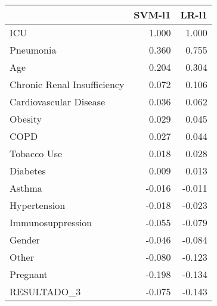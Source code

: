 \begin{tabular}{lrr}
\toprule
{} &  SVM-l1 &  LR-l1 \\
\midrule
ICU                         &   1.000 &  1.000 \\
Pneumonia                   &   0.360 &  0.755 \\
Age                         &   0.204 &  0.304 \\
Chronic Renal Insufficiency &   0.072 &  0.106 \\
Cardiovascular Disease      &   0.036 &  0.062 \\
Obesity                     &   0.029 &  0.045 \\
COPD                        &   0.027 &  0.044 \\
Tobacco Use                 &   0.018 &  0.028 \\
Diabetes                    &   0.009 &  0.013 \\
Asthma                      &  -0.016 & -0.011 \\
Hypertension                &  -0.018 & -0.023 \\
Immunosuppression           &  -0.055 & -0.079 \\
Gender                      &  -0.046 & -0.084 \\
Other                       &  -0.080 & -0.123 \\
Pregnant                    &  -0.198 & -0.134 \\
RESULTADO\_3                 &  -0.075 & -0.143 \\
\bottomrule
\end{tabular}
